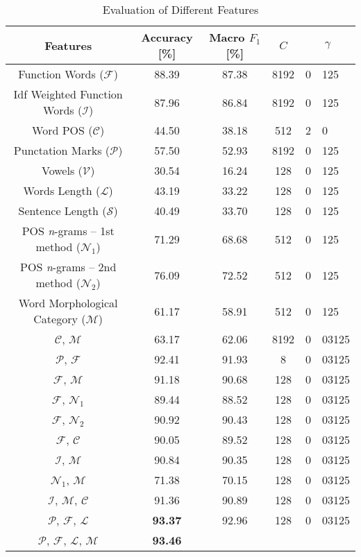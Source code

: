 \documentclass{llncs}
\begin{document}
\begin{table*}[htb]
\begin{center}
\caption{Evaluation of Different Features}%
\begin{tabular}{c c c c r@{.}l}%
\toprule%
Features & Accuracy [\%] & Macro $F_1$ [\%] & $C$ &
\multicolumn{2}{c}{$\gamma$}\\
\midrule
Function Words ($\mathcal{F}$) & 88.39 & 87.38 & 8192 & 0 & 125\\
Idf Weighted Function Words ($\mathcal{I}$) & 87.96 & 86.84 & 8192 & 0 & 125\\
Word POS ($\mathcal{C}$) & 44.50 & 38.18 & 512 & 2 & 0\\
Punctation Marks ($\mathcal{P}$) & 57.50 & 52.93 & 8192 & 0 & 125\\
Vowels ($\mathcal{V}$) & 30.54 & 16.24 & 128 & 0 & 125\\
Words Length ($\mathcal{L}$) & 43.19 & 33.22 & 128 & 0 & 125\\
Sentence Length ($\mathcal{S}$) & 40.49 & 33.70 & 128 & 0 & 125\\
POS \emph{n}-grams -- 1st method ($\mathcal{N}_1$) & 71.29 &
68.68 & 512 & 0 & 125\\
POS \emph{n}-grams -- 2nd method ($\mathcal{N}_2$) & 76.09
& 72.52 & 512 & 0 & 125\\
Word Morphological Category ($\mathcal{M}$) & 61.17 & 58.91 & 512 & 0 & 125\\
$\mathcal{C}$, $\mathcal{M}$ & 63.17 & 62.06 & 8192 & 0 & 03125\\
$\mathcal{P}$, $\mathcal{F}$ & 92.41 & 91.93 & 8 & 0 & 03125\\
$\mathcal{F}$, $\mathcal{M}$ & 91.18 & 90.68 & 128 & 0 & 03125\\
$\mathcal{F}$, $\mathcal{N}_1$ & 89.44 & 88.52 & 128 & 0 & 03125\\
$\mathcal{F}$, $\mathcal{N}_2$ & 90.92 & 90.43 & 128 & 0 & 03125\\
$\mathcal{F}$, $\mathcal{C}$ & 90.05 & 89.52 & 128 & 0 & 03125\\
$\mathcal{I}$, $\mathcal{M}$ & 90.84 & 90.35 & 128 & 0 & 03125\\
$\mathcal{N}_1$, $\mathcal{M}$ & 71.38 & 70.15 & 128 & 0 & 03125\\
$\mathcal{I}$, $\mathcal{M}$, $\mathcal{C}$ & 91.36 & 90.89 & 128 & 0 & 03125\\
$\mathcal{P}$, $\mathcal{F}$, $\mathcal{L}$ & \textbf{93.37} & 92.96 & 128 & 0 & 03125\\
$\mathcal{P}$, $\mathcal{F}$, $\mathcal{L}$, $\mathcal{M}$ & \textbf{93.46} &

\end{tabular}
\end{center}
\end{table*}
\end{document}
